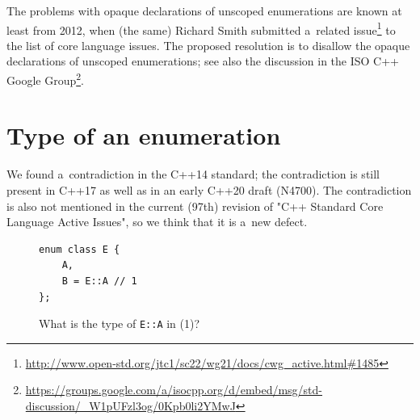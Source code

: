 \documentclass[nolot,nolof,nocover,printed]{fithesis3}
\begin{document}
The problems with opaque declarations of unscoped enumerations are known at least from 2012, when (the same) Richard Smith submitted a~related issue\footnote{\url{http://www.open-std.org/jtc1/sc22/wg21/docs/cwg\_active.html\#1485}} to the list of core language issues. The proposed resolution is to disallow the opaque declarations of unscoped enumerations; see also the discussion in the ISO C++ Google Group\footnote{\url{https://groups.google.com/a/isocpp.org/d/embed/msg/std-discussion/\_W1pUFzl3og/0Kpb0li2YMwJ}}.


\section{Type of an enumeration}

We found a~contradiction in the C++14 standard; the contradiction is still present in C++17 as well as in an early C++20 draft (N4700).
The contradiction is also not mentioned in the current (97th) revision of "C++ Standard Core Language Active Issues", so we think that it is a~new defect.

\begin{figure}[ht]
\begin{lstlisting}
enum class E {
    A,
    B = E::A // 1
};
\end{lstlisting}
\caption{What is the type of \lstinline|E::A| in (1)?}
\label{fig:typeOfAQualifiedEnumerator}
\end{figure}
\end{document}
